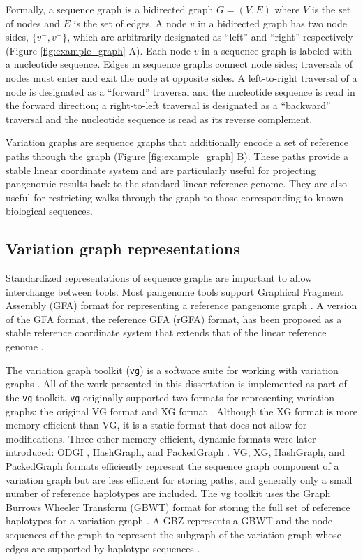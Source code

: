\documentclass[11pt]{ucscthesis}
\begin{document}
Formally, a sequence graph is a bidirected graph $G = (V, E)$ where $V$ is the set of nodes and $E$ is the set of edges.
A node $v$ in a bidirected graph has two node sides, $\{v^{-}, v^{+}\}$, which are arbitrarily designated as ``left'' and ``right'' respectively (Figure \ref{fig:example_graph} A).
Each node $v$ in a sequence graph is labeled with a nucleotide sequence.
Edges in sequence graphs connect node sides; traversals of nodes must enter and exit the node at opposite sides.
A left-to-right traversal of a node is designated as a ``forward'' traversal and the nucleotide sequence is read in the forward direction; a right-to-left traversal is designated as a ``backward'' traversal and the nucleotide sequence is read as its reverse complement.

Variation graphs are sequence graphs that additionally encode a set of reference paths through the graph (Figure \ref{fig:example_graph} B).
These paths provide a stable linear coordinate system and are particularly useful for projecting pangenomic results back to the standard linear reference genome.
They are also useful for restricting walks through the graph to those corresponding to known biological sequences.

\subsection{Variation graph representations}

Standardized representations of sequence graphs are important to allow interchange between tools.
Most pangenome tools support Graphical Fragment Assembly (GFA) format for representing a reference pangenome graph \cite{eizenga_pangenome_2020}. 
A version of the GFA format, the reference GFA (rGFA) format, has been proposed as a stable reference coordinate system that extends that of the linear reference genome \cite{li_minigraph_2020}. 

The variation graph toolkit (\texttt{vg}) is a software suite for working with variation graphs \cite{garrison_vg_2018}.
All of the work presented in this dissertation is implemented as part of the \texttt{vg} toolkit.
\texttt{vg} originally supported two formats for representing variation graphs: the original VG format and XG format \cite{garrison_vg_2018}.
Although the XG format is more memory-efficient than VG, it is a static format that does not allow for modifications.
Three other memory-efficient, dynamic formats were later introduced: ODGI \cite{guarracino_odgi_2022}, HashGraph, and PackedGraph \cite{eizenga2020efficient}.
VG, XG, HashGraph, and PackedGraph formats efficiently represent the sequence graph component of a variation graph but are less efficient for storing paths, and generally only a small number of reference haplotypes are included.
The vg toolkit uses the Graph Burrows Wheeler Transform (GBWT) format for storing the full set of reference haplotypes for a variation graph \cite{siren_indexes_2020}.
A GBZ represents a GBWT and the node sequences of the graph to represent the subgraph of the variation graph whose edges are supported by haplotype sequences \cite{siren_gbz_2022}.
\end{document}
